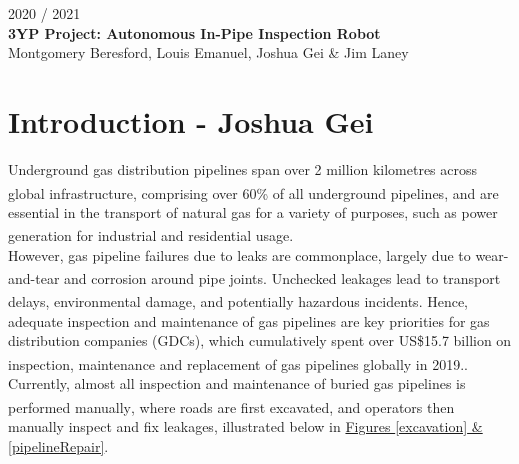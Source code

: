 \documentclass[11pt]{article}		%
\newcommand{\supercite}[1]{\textsuperscript{\cite{#1}}}		%
\begin{document}
	
	\flushleft
	\raggedright

	\begin{center}
		\vspace*{2cm}
		2020 / 2021\\ %
		\vspace*{6cm}
		\huge{\textbf{3YP Project: Autonomous In-Pipe Inspection Robot}}\\ 
		\vspace*{6cm}
		\large{Montgomery Beresford, Louis Emanuel, Joshua Gei \& Jim Laney}
		\thispagestyle{empty} %
	\end{center}

	\newpage
	
	\pagestyle{empty}
	
	\setlength{\columnsep}{1.5cm} %
	\setlength{\columnseprule}{0.5pt} %
	
	\begin{multicols*}{2}
	    \tableofcontents
    \end{multicols*}
	
	\setlength{\columnsep}{10pt} %
	\setlength{\columnseprule}{0pt} %
	
	\newpage
    \pagestyle{plain}
	\setcounter{page}{1}
	
	\section[Introduction]{Introduction - Joshua Gei}
	
		Underground gas distribution pipelines span over 2 million kilometres across global infrastructure, comprising over 60\% of all underground pipelines\supercite{sönnichsen_5_2021}, and are essential in the transport of natural gas for a variety of purposes, such as power generation for industrial and residential usage\supercite{group.met.com}. \\ \hspace*{3ex}
		However, gas pipeline failures due to leaks are commonplace, largely due to wear-and-tear and corrosion around pipe joints\supercite{corrosion1}. Unchecked leakages lead to transport delays, environmental damage, and potentially hazardous incidents\supercite{hazardousincidents}. Hence, adequate inspection and maintenance of gas pipelines are key priorities for gas distribution companies (GDCs), which cumulatively spent over US\$15.7 billion on inspection, maintenance  and replacement of gas pipelines globally in 2019.\supercite{ltd}. \\ \hspace*{3ex}
		Currently, almost all inspection and maintenance of buried gas pipelines is performed manually\supercite{manually}, where roads are first excavated, and operators then manually inspect and fix leakages, illustrated below in \hyperref[excavation]{Figures \ref*{excavation} \& \ref*{pipelineRepair}}.
\end{document}
